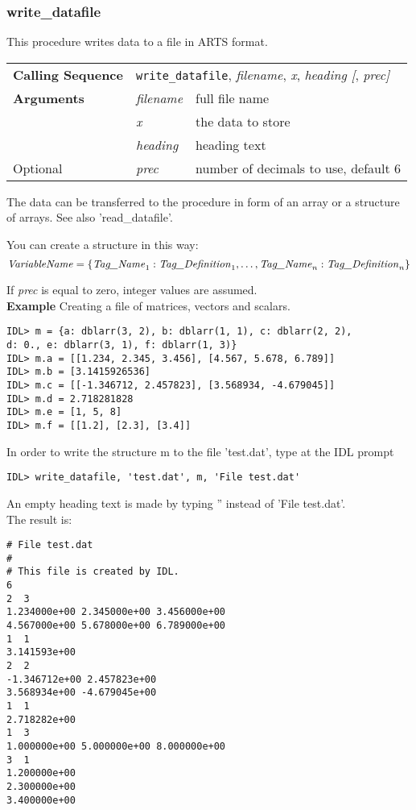 \subsubsection{write\_datafile}
This procedure writes data to a file in ARTS format.
\begin{center}
\begin{tabular}{|l|ll|}
  \hline
  \textbf{Calling Sequence} &
  \multicolumn{2}{l|}{\texttt{write\_datafile}, %
                      \textit{filename}, \textit{x}, %
                      \textit{heading [}, \textit{prec]}}    \\
  \textbf{Arguments} & \textit{filename} & full file name    \\
                     & \textit{x}        & the data to store \\
                     & \textit{heading}  & heading text      \\
  Optional           & \textit{prec}     &
                       number of decimals to use, default 6  \\
  \hline
\end{tabular}
\end{center}
The data can be transferred to the procedure in form of an array or a
structure of arrays. See also 'read\_datafile'.

You can create a structure in this way:
\begin{displaymath}
  \mbox{\textit{VariableName}} = 
  \{
  \mbox{\textit{Tag\_Name}}_1 : \mbox{\textit{Tag\_Definition}}_1,
  \ldots,
  \mbox{\textit{Tag\_Name}}_n : \mbox{\textit{Tag\_Definition}}_n
  \}
\end{displaymath}

If \textit{prec} is equal to zero, integer values are assumed. \\
\textbf{Example} \hspace{1ex} Creating a file of matrices, vectors and
scalars.
\begin{verbatim}
IDL> m = {a: dblarr(3, 2), b: dblarr(1, 1), c: dblarr(2, 2),
d: 0., e: dblarr(3, 1), f: dblarr(1, 3)}
IDL> m.a = [[1.234, 2.345, 3.456], [4.567, 5.678, 6.789]]
IDL> m.b = [3.1415926536]
IDL> m.c = [[-1.346712, 2.457823], [3.568934, -4.679045]]
IDL> m.d = 2.718281828
IDL> m.e = [1, 5, 8]
IDL> m.f = [[1.2], [2.3], [3.4]]
\end{verbatim}
In order to write the structure m to  the file 'test.dat', type at the
IDL prompt
\begin{verbatim}
IDL> write_datafile, 'test.dat', m, 'File test.dat'
\end{verbatim}
An empty heading text is made by typing '' instead of 'File test.dat'.
\\
The result is:
\begin{verbatim}
# File test.dat
#
# This file is created by IDL.
6
2  3
1.234000e+00 2.345000e+00 3.456000e+00
4.567000e+00 5.678000e+00 6.789000e+00
1  1
3.141593e+00
2  2
-1.346712e+00 2.457823e+00
3.568934e+00 -4.679045e+00
1  1
2.718282e+00
1  3
1.000000e+00 5.000000e+00 8.000000e+00
3  1
1.200000e+00
2.300000e+00
3.400000e+00
\end{verbatim}
